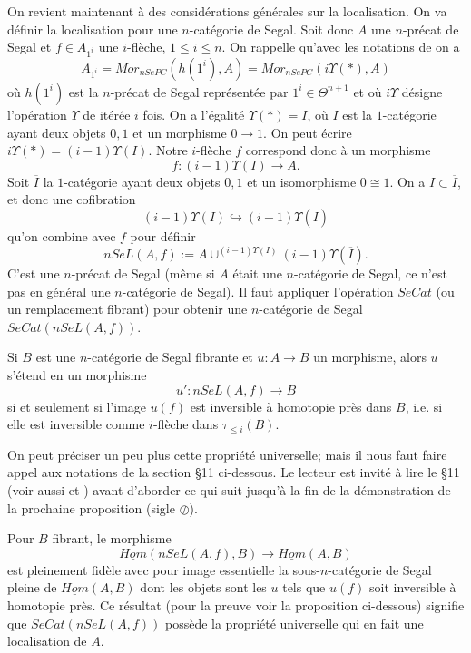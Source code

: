 \documentclass[12pt]{article}
\begin{document}
On revient maintenant \`a des consid\'erations g\'en\'erales sur la
localisation.
On va d\'efinir la localisation pour une $n$-cat\'egorie de Segal. Soit donc
$A$ une $n$-pr\'ecat de Segal et $f\in  A_{1^i}$ une $i$-fl\`eche, $1\leq i\leq
n$. On rappelle qu'avec les notations de \cite{limits} on a
$$
A_{1^i} = Mor _{nSePC}(h(1^i),A)
=Mor _{nSePC}(i\Upsilon (\ast ),A)
$$
o\`u $h(1^i)$ est la $n$-pr\'ecat de Segal repr\'esent\'ee par $1^i\in \Theta
^{n+1}$
et o\`u
$i\Upsilon$ d\'esigne l'op\'eration $\Upsilon$ de \cite{limits} it\'er\'ee $i$
fois. On a l'\'egalit\'e $\Upsilon (\ast )=  I$, o\`u $I$
est la $1$-cat\'egorie ayant deux objets
$0,1$ et un morphisme $0\rightarrow 1$.
On peut \'ecrire $i\Upsilon (\ast ) = (i-1)\Upsilon (I)$. Notre
$i$-fl\`eche $f$
correspond donc \`a un morphisme
$$
f: (i-1)\Upsilon (I)\rightarrow A.
$$
Soit $\overline{I}$ la $1$-cat\'egorie ayant deux
objets $0,1$ et un isomorphisme $0\cong 1$. On a $I\subset \overline{I}$,
et donc une cofibration
$$
(i-1)\Upsilon (I)\hookrightarrow
(i-1)\Upsilon (\overline{I})
$$
qu'on combine avec $f$ pour d\'efinir
$$
nSeL(A, f) := A \cup ^{ (i-1)\Upsilon (I)}(i-1)\Upsilon
(\overline{I}).
$$
C'est une $n$-pr\'ecat de Segal (m\^eme si $A$ \'etait une $n$-cat\'egorie de
Segal, ce n'est pas en g\'en\'eral une
$n$-cat\'egorie de Segal). Il faut appliquer l'op\'eration $SeCat$ (ou un
remplacement fibrant) pour obtenir une $n$-cat\'egorie de Segal
$SeCat(nSeL(A, f))$.


Si $B$ est une $n$-cat\'egorie de Segal fibrante et $u:A\rightarrow B$ un
morphisme, alors $u$ s'\'etend en un morphisme
$$
u':  nSeL(A, f) \rightarrow B
$$
si et seulement si l'image $u(f)$ est inversible
\`a homotopie pr\`es dans $B$, i.e. si elle est inversible comme $i$-fl\`eche
dans $\tau
_{\leq i}(B)$.


On peut pr\'eciser un peu plus cette propri\'et\'e universelle; mais il
nous faut
faire appel aux  notations de la section \S 11 ci-dessous. Le lecteur est
invit\'e
\`a lire le \S 11 (voir aussi \cite{nCAT} et
\cite{limits}) avant d'aborder ce qui suit
jusqu'\`a la fin de la d\'emonstration de la prochaine proposition (sigle
$\oslash$).

Pour $B$ fibrant, le morphisme
$$
\underline{Hom}(nSeL(A, f), B)\rightarrow
\underline{Hom}(A, B)
$$
est pleinement fid\`ele avec pour image essentielle la
sous-$n$-cat\'egorie de Segal pleine de $\underline{Hom}(A, B)$ dont les objets
sont les $u$ tels que $u(f)$ soit inversible \`a homotopie pr\`es. Ce r\'esultat
(pour la preuve voir la proposition ci-dessous) signifie que
$SeCat(nSeL(A, f))$ poss\`ede la propri\'et\'e universelle qui en fait une
localisation de $A$.
\end{document}
